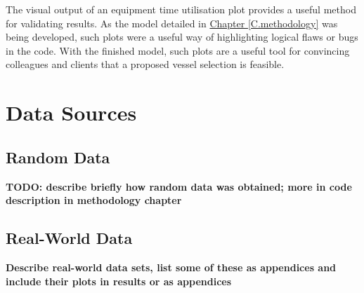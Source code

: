 The visual output of an equipment time utilisation plot provides a useful
method for validating results.
As the model detailed in 
\hyperref[C.methodology]{Chapter \ref*{C.methodology}} was being developed,
such plots were a useful way of highlighting logical flaws or bugs in the code.
With the finished model, such plots are a useful tool for convincing
colleagues and clients that a proposed vessel selection is feasible.

\section{Data Sources}\label{S.sources}

\subsection{Random Data}\label{SS.randomdata}
\textbf{TODO: describe briefly how random data was obtained; more in code
        description in methodology chapter}
        
\subsection{Real-World Data}\label{SS.realdata}
\textbf{Describe real-world data sets, list some of these as appendices and
        include their plots in results or as appendices}

